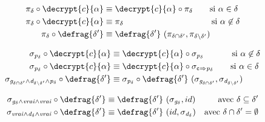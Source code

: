 \begin{align}
	\ccPrj{\delta} \circ \decrypt{c}{\alpha}
	&\equiv \decrypt{c}{\alpha} \circ \ccPrj{\delta} \qquad
	\text{si $\alpha \in \delta$}
	\label{eq:law-pi-enc}\\
	\ccPrj{\delta} \circ \decrypt{c}{\alpha}
	&\equiv \ccPrj{\delta}\ \hphantom{\decrypt{c}{\alpha} \circ\ } \qquad
	\text{si $\alpha \not\in \delta$}
	\label{eq:law-pi-enc2}\\
	\ccPrj{\delta} \circ \defrag{\delta'}
	&\equiv \defrag{\delta'}\ (
	\ccPrj{\delta \cap \delta'},
	\ccPrj{\delta \setminus \delta'}
	)\label{eq:law-pi-frag}
\end{align}

\begin{align}
	\ccSlt{p_{\delta}} \circ \decrypt{c}{\alpha} &\equiv
	\decrypt{c}{\alpha} \circ \ccSlt{p_{\delta}} \quad\qquad
	\text{ si $\alpha \not\in \delta$}
	\label{eq:law-sel-enc1}\\
	\ccSlt{p_{\delta}} \circ \decrypt{c}{\alpha} &\equiv
	\decrypt{c}{\alpha} \circ \ccSlt{\typeT{c} \Rightarrow p_{\delta}}\qquad
	\text{si $\alpha \in \delta$}
	\label{eq:law-sel-enc2}\\
	\ccSlt{g_{\delta \cap \delta'} \land
		d_{\delta \setminus \delta'} \land
		p_{\delta}} \circ \defrag{\delta'} &\equiv
	\ccSlt{p_\delta} \circ \defrag{\delta'}\ (
	\ccSlt{g_{\delta \cap \delta'}},
	\ccSlt{d_{\delta \setminus \delta'}}
	)\label{eq:law-sel-frag1}
\end{align}

\begin{align}
	\ccSlt{g_{\delta}
		\land vrai
		\land vrai} \circ \defrag{\delta'}
	&\equiv \defrag{\delta'}\ (\ccSlt{g_{\delta}}, id)
	&\text{avec $\delta \subseteq \delta'$}
	\label{eq:law-sel-frag2}\\
	\ccSlt{vrai
		\land d_{\delta}
		\land vrai} \circ \defrag{\delta'}
	&\equiv \defrag{\delta'}\ (id, \ccSlt{d_{\delta}})
	&\text{avec $\delta \cap \delta' = \emptyset$}
	\label{eq:law-sel-frag3}
\end{align}


